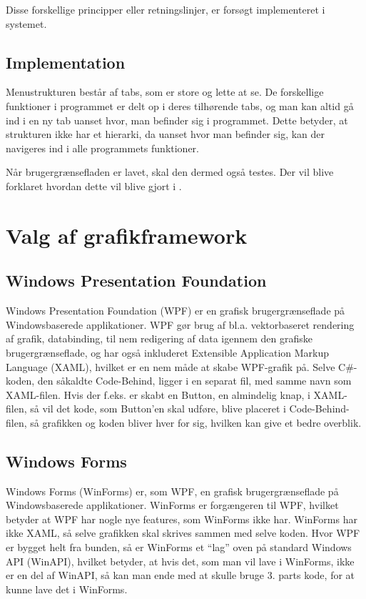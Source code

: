 Disse forskellige principper eller retningslinjer, er forsøgt implementeret i systemet.


\subsection{Implementation}\label{sec:Implementation}

Menustrukturen består af tabs, som er store og lette at se.
De forskellige funktioner i programmet er delt op i deres tilhørende tabs, og man kan altid gå ind i en ny tab uanset hvor, man befinder sig i programmet. 
Dette betyder, at strukturen ikke har et hierarki, da uanset hvor man befinder sig, kan der navigeres ind i alle programmets funktioner.

Når brugergrænsefladen er lavet, skal den dermed også testes. Der vil blive forklaret hvordan dette vil blive gjort i .
\section{Valg af grafikframework} 

\subsection{Windows Presentation Foundation}
Windows Presentation Foundation (WPF) er en grafisk brugergrænseflade på Windowsbaserede applikationer. 
WPF gør brug af  bl.a. vektorbaseret rendering af grafik, databinding, til nem redigering af data igennem den grafiske brugergrænseflade, og har også inkluderet Extensible Application Markup Language (XAML), hvilket er en nem måde at skabe WPF-grafik på. 
Selve C\#-koden, den såkaldte Code-Behind, ligger i en separat fil, med samme navn som XAML-filen. 
Hvis der f.eks. er skabt en Button, en almindelig knap, i XAML-filen, så vil det kode, som Button'en skal udføre, blive placeret i Code-Behind-filen, så grafikken og koden bliver hver for sig, hvilken kan give et bedre overblik.\citep{wpf} 

\subsection{Windows Forms}
Windows Forms (WinForms) er, som WPF, en grafisk brugergrænseflade på Windowsbaserede applikationer. WinForms er forgængeren til WPF, hvilket betyder at WPF har nogle nye features, som WinForms ikke har.
WinForms har ikke XAML, så selve grafikken skal skrives sammen med selve koden. 
Hvor WPF er bygget helt fra bunden, så er WinForms et ``lag'' oven på standard Windows API (WinAPI), hvilket betyder, at hvis det, som man vil lave i WinForms, ikke er en del af WinAPI, så kan man ende med at skulle bruge 3. parts kode, for at kunne lave det i WinForms.\citep{winforms2}

